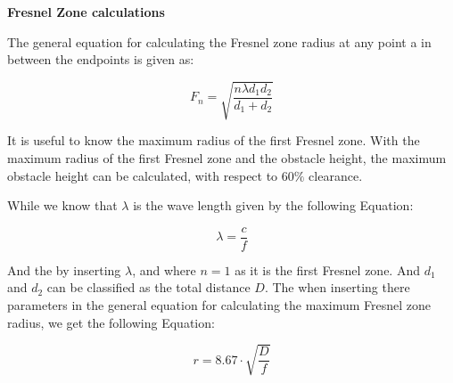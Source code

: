 



\textbf{Fresnel Zone calculations}

The general equation for calculating the Fresnel zone radius at any point a in between the endpoints is given as:

\begin{equation}
F_{n} = \sqrt{\frac{n \lambda d_{1} d_{2}}{d_{1}+d_{2}}}
\label{fres:eq}
\end{equation}

\begin{where}
\end{where}

It is useful to know the maximum radius of the first Fresnel zone. With the maximum radius of the first Fresnel zone and the obstacle height, the maximum obstacle height can be calculated, with respect to $60\%$ clearance. %


While we know that $\lambda$ is the wave length given by the following Equation:

\begin{equation}
\lambda = \frac{c}{f}
\label{fres:eq}
\end{equation}

\begin{where}
\end{where}






And the by inserting $\lambda$, and where $n=1$ as it is the first Fresnel zone. And $d_{1}$ and $d_{2}$ can be classified as the total distance $D$. The when inserting there parameters in the general equation for calculating the maximum Fresnel zone radius, we get the following Equation:

\begin{equation}
r = 8.67 \cdot \sqrt{\frac{D}{f}}
\label{fres:eq}
\end{equation}

